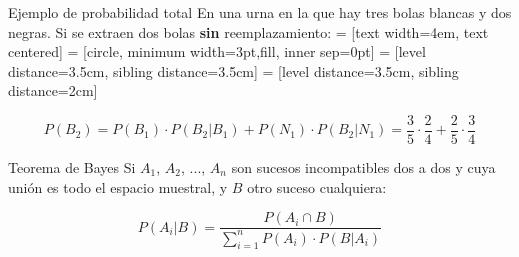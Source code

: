 \documentclass[11pt,handout]{beamer}
\begin{document}
\begin{frame}{Ejemplo de probabilidad total}
En una urna en la que hay tres bolas blancas y dos negras. Si se extraen dos bolas \textbf{sin} reemplazamiento:
 = [text width=4em, text centered]
 = [circle, minimum width=3pt,fill, inner sep=0pt]
 = [level distance=3.5cm, sibling distance=3.5cm]
 = [level distance=3.5cm, sibling distance=2cm]
\pause
$$P(B_2)=P(B_1)\cdot P(B_2|B_1) + P(N_1)\cdot P(B_2|N_1)
= \frac{3}{5}\cdot\frac{2}{4} + \frac{2}{5}\cdot\frac{3}{4}$$
\end{frame}


\begin{frame}{Teorema de Bayes}
Si $A_1$, $A_2$, ..., $A_n$   son sucesos incompatibles dos a dos y cuya unión es todo el espacio muestral, y $B$ otro suceso cualquiera:
\begin{block}{}
$$P(A_i|B)=\dfrac{P(A_i \cap B)}{\sum_{i=1}^n P(A_i)\cdot  P(B|A_i)} $$
\end{block}
\end{frame}
\end{document}
